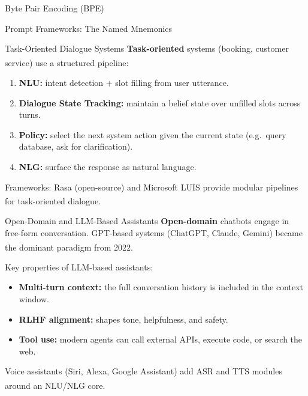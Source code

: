 \begin{v3topic}{Byte Pair Encoding (BPE)}
\begin{v3topic}{Prompt Frameworks: The Named Mnemonics}
\begin{v3topic}{Task-Oriented Dialogue Systems}
    \textbf{Task-oriented} systems (booking, customer service) use a structured
    pipeline:\textsuperscript{\cite[][p.~11]{dhamaniIntroductionGenerativeAI2024}}
    \begin{enumerate}
        \item \textbf{NLU:} intent detection + slot filling from user utterance.
        \item \textbf{Dialogue State Tracking:} maintain a belief state over unfilled
              slots across turns.
        \item \textbf{Policy:} select the next system action given the current state
              (e.g.\ query database, ask for clarification).
        \item \textbf{NLG:} surface the response as natural language.
    \end{enumerate}
    Frameworks: Rasa (open-source) and Microsoft LUIS provide modular pipelines for
    task-oriented
    dialogue.\textsuperscript{\cite[][p.~11]{dhamaniIntroductionGenerativeAI2024}}

\end{v3topic}
\begin{v3topic}{Open-Domain and LLM-Based Assistants}
    \textbf{Open-domain} chatbots engage in free-form conversation. GPT-based systems
    (ChatGPT, Claude, Gemini) became the dominant paradigm from
    2022.\textsuperscript{\cite[][p.~1]{farrisHowLargeLanguage2025}}

    Key properties of LLM-based assistants:
    \begin{itemize}
        \item \textbf{Multi-turn context:} the full conversation history is included in
              the context window.
        \item \textbf{RLHF alignment:} shapes tone, helpfulness, and safety.
        \item \textbf{Tool use:} modern agents can call external APIs, execute code, or
              search the web.
    \end{itemize}

    Voice assistants (Siri, Alexa, Google Assistant) add ASR and TTS modules around an
    NLU/NLG
    core.\textsuperscript{\cite[][p.~11]{dhamaniIntroductionGenerativeAI2024}}

\end{v3topic}


\end{v3topic}
\end{v3topic}
